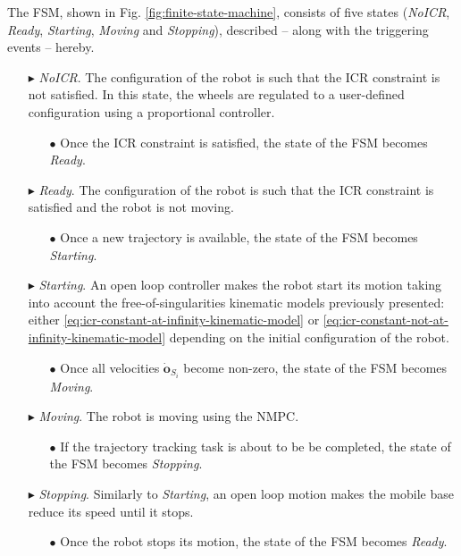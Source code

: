 The FSM, shown in Fig. \ref{fig:finite-state-machine}, consists of five states (\textit{NoICR}, \textit{Ready}, \textit{Starting}, \textit{Moving} and \textit{Stopping}), described -- along with the triggering events -- hereby.
\begin{itemize}
    \item[$\blacktriangleright$] \textit{NoICR}. The configuration of the robot is such that the ICR constraint is not satisfied. In this state, the wheels are regulated to a user-defined configuration using a proportional controller.
        \begin{itemize}
            \item[$\bullet$] Once the ICR constraint is satisfied, the state of the FSM becomes \textit{Ready}.
        \end{itemize}
    \item[$\blacktriangleright$] \textit{Ready}. The configuration of the robot is such that the ICR constraint is satisfied and the robot is not moving.
        \begin{itemize}
            \item[$\bullet$] Once a new trajectory is available, the state of the FSM becomes \textit{Starting}.
        \end{itemize}
    \item[$\blacktriangleright$] \textit{Starting}. An open loop controller makes the robot start its motion taking into account the free-of-singularities kinematic models previously presented: either \eqref{eq:icr-constant-at-infinity-kinematic-model} or \eqref{eq:icr-constant-not-at-infinity-kinematic-model} depending on the initial configuration of the robot.
        \begin{itemize}
            \item[$\bullet$] Once all velocities $\dot{\bm{o}}_{S_i}$ become non-zero, the state of the FSM becomes \textit{Moving}.
        \end{itemize}
    \item[$\blacktriangleright$] \textit{Moving}. The robot is moving using the NMPC.
        \begin{itemize}
            \item[$\bullet$] If the trajectory tracking task is about to be be completed, the state of the FSM becomes \textit{Stopping}.
        \end{itemize}
    \item[$\blacktriangleright$] \textit{Stopping}. Similarly to \textit{Starting}, an open loop motion makes the mobile base reduce its speed until it stops.
        \begin{itemize}
            \item[$\bullet$] Once the robot stops its motion, the state of the FSM becomes \textit{Ready}.
        \end{itemize}
\end{itemize}

